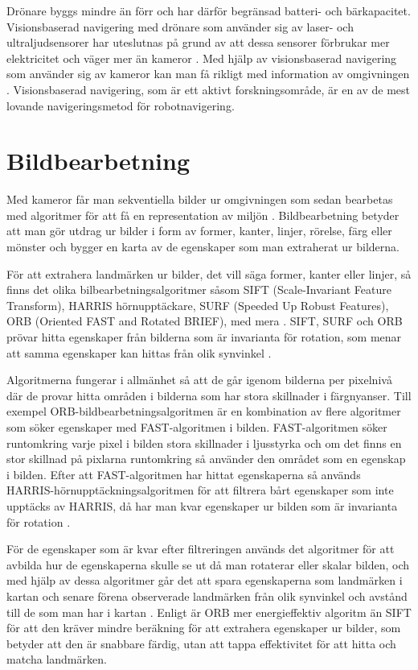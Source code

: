 Drönare byggs mindre än förr och har därför begränsad batteri- och bärkapacitet. Visionsbaserad navigering med drönare som använder sig av laser- och ultraljudsensorer har uteslutnas på grund av att dessa sensorer förbrukar mer elektricitet och väger mer än kameror \citep{6385934}. Med hjälp av visionsbaserad navigering som använder sig av kameror kan man få rikligt med information av omgivningen \citep{geospatial}. Visionsbaserad navigering, som är ett aktivt forskningsområde, är en av de mest lovande navigeringsmetod för robotnavigering.

\section{Bildbearbetning}

Med kameror får man sekventiella bilder ur omgivningen som sedan bearbetas med algoritmer för att få en representation av miljön \citep{982903}. Bildbearbetning betyder att man gör utdrag ur bilder i form av former, kanter, linjer, rörelse, färg eller mönster och bygger en karta av de egenskaper som man extraherat ur bilderna. 

För att extrahera landmärken ur bilder, det vill säga former, kanter eller linjer, så finns det olika bilbearbetningsalgoritmer såsom SIFT (Scale-Invariant Feature Transform), HARRIS hörnupptäckare, SURF (Speeded Up Robust Features), ORB (Oriented FAST and Rotated BRIEF), med mera \citep{orb, slamproblem, mapbuildingsift}. SIFT, SURF och ORB prövar hitta egenskaper från bilderna som är invarianta för rotation, som menar att samma egenskaper kan hittas från olik synvinkel \citep{orb}. 

Algoritmerna fungerar i allmänhet så att de går igenom bilderna per pixelnivå där de provar hitta områden i bilderna som har stora skillnader i färgnyanser. Till exempel ORB-bildbearbetningsalgoritmen är en kombination av flere algoritmer som söker egenskaper med FAST-algoritmen i bilden. FAST-algoritmen söker runtomkring varje pixel i bilden stora skillnader i ljusstyrka och om det finns en stor skillnad på pixlarna runtomkring så använder den området som en egenskap i bilden. Efter att FAST-algoritmen har hittat egenskaperna så används HARRIS-hörnupptäckningsalgoritmen för att filtrera bårt egenskaper som inte upptäcks av HARRIS, då har man kvar egenskaper ur bilden som är invarianta för rotation \citep{orb}. 

För de egenskaper som är kvar efter filtreringen används det algoritmer för att avbilda hur de egenskaperna skulle se ut då man rotaterar eller skalar bilden, och med hjälp av dessa algoritmer går det att spara egenskaperna som landmärken i kartan och senare förena observerade landmärken från olik synvinkel och avstånd till de som man har i kartan \citep{orb}. Enligt \cite{orb} är ORB mer energieffektiv algoritm än SIFT för att den kräver mindre beräkning för att extrahera egenskaper ur bilder, som betyder att den är snabbare färdig, utan att tappa effektivitet för att hitta och matcha landmärken.

